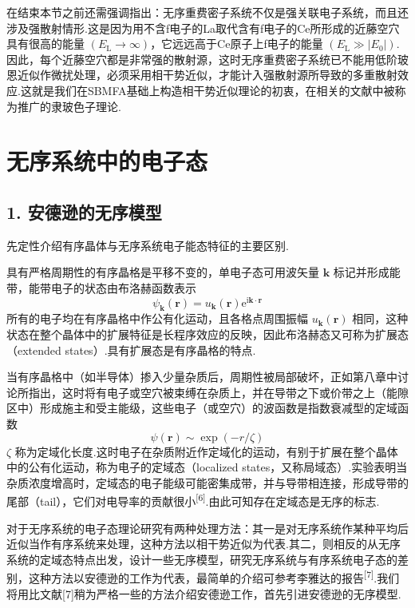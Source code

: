 在结束本节之前还需强调指出：无序重费密子系统不仅是强关联电子系统，而且还涉及强散射情形.这是因为用不含f电子的La取代含有f电子的Ce所形成的近藤空穴具有很高的能量 $\left(E_{\mathrm{L}}\rightarrow\infty\right)$，它远远高于Ce原子上f电子的能量 $\left(E_{\mathrm{L}}\gg|E_{0}|\right)$.因此，每个近藤空穴都是非常强的散射源，这时无序重费密子系统已不能用低阶玻恩近似作微扰处理，必须采用相干势近似，才能计入强散射源所导致的多重散射效应.这就是我们在SBMFA基础上构造相干势近似理论的初衷，在相关的文献中被称为推广的隶玻色子理论.

\section{无序系统中的电子态}

\subsection*{1. 安德逊的无序模型}

先定性介绍有序晶体与无序系统电子能态特征的主要区别.

具有严格周期性的有序晶格是平移不变的，单电子态可用波矢量 $\boldsymbol{k}$ 标记并形成能带，能带电子的状态由布洛赫函数表示
\begin{equation*}
  \psi_{\boldsymbol{k}}\left(\boldsymbol{r}\right)=u_{\boldsymbol{k}}\left(\boldsymbol{r}\right)\mathrm{e}^{\mathrm{i}\boldsymbol{k}\cdot\boldsymbol{r}}
\end{equation*}
所有的电子均在有序晶格中作公有化运动，且各格点周围振幅 $u_{\boldsymbol{k}}\left(\boldsymbol{r}\right)$ 相同，这种状态在整个晶体中的扩展特征是长程序效应的反映，因此布洛赫态又可称为扩展态（extended states）.具有扩展态是有序晶格的特点.

当有序晶格中（如半导体）掺入少量杂质后，周期性被局部破坏，正如第八章中讨论所指出，这时将有电子或空穴被束缚在杂质上，并在导带之下或价带之上（能隙区中）形成施主和受主能级，这些电子（或空穴）的波函数是指数衰减型的定域函数
\begin{equation*}
  \psi\left(\boldsymbol{r}\right)\sim\exp\left(-r/\zeta\right)
\end{equation*}
$\zeta$ 称为定域化长度.这时电子在杂质附近作定域化的运动，有别于扩展在整个晶体中的公有化运动，称为电子的定域态（localized states，又称局域态）.实验表明当杂质浓度增高时，定域态的电子能级可能密集成带，并与导带相连接，形成导带的尾部（tail），它们对电导率的贡献很小\textsuperscript{[6]}.由此可知存在定域态是无序的标志.

对于无序系统的电子态理论研究有两种处理方法：其一是对无序系统作某种平均后近似当作有序系统来处理，这种方法以相干势近似为代表.其二，则相反的从无序系统的定域态特点出发，设计一些无序模型，研究无序系统与有序系统电子态的差别，这种方法以安德逊的工作为代表，最简单的介绍可参考李雅达的报告\textsuperscript{[7]}.我们将用比文献[7]稍为严格一些的方法介绍安德逊工作，首先引进安德逊的无序模型.

